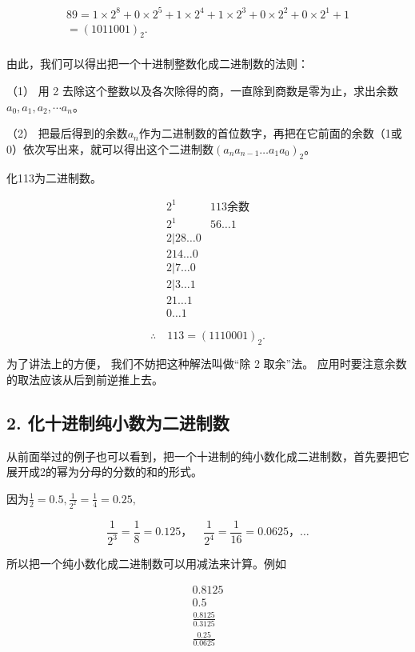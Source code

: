 \[
\begin{array}{l} 89 = 1 \times 2 ^{8} + 0 \times 2 ^{5} + 1 \times 2 ^{4} + 1 \times 2 ^{3} + 0 \times 2 ^{2} + 0 \times 2 ^{1} + 1 \\ = (1011001) _{2}. \\ \end{array}
\]

由此，我们可以得出把一个十进制整数化成二进制数的法则：

（1） 用 2
去除这个整数以及各次除得的商，一直除到商数是零为止，求出余数\(a_0, a_1, a_2, \cdots a_n\)。

（2）
把最后得到的余数\(a_{n}\)作为二进制数的首位数字，再把在它前面的余数（1或0）依次写出来，就可以得出这个二进制数\((a_{n}a_{n - 1}\dots a_{1}a_{0})_{2}\)。

 化113为二进制数。


\[
\begin{array}{rl} {2 ^{1}} & {113 \text{余数}} \\ {2 ^{1}} & {56 \dots 1} \\ {2 | 28 \dots 0} \\ {214 \dots 0} \\ {2 | 7 \dots 0} \\ {2 | 3 \dots 1} \\ {21 \dots 1} \\ \hline {0 \dots 1} \end{array}
\]

\[
\therefore \quad 113 = (1110001) _{2}.
\]

为了讲法上的方便， 我们不妨把这种解法叫做``除 2 取余''法。
应用时要注意余数的取法应该从后到前逆推上去。

\subsection{2. 化十进制纯小数为二进制数}

从前面举过的例子也可以看到，把一个十进制的纯小数化成二进制数，首先要把它展开成2的幂为分母的分数的和的形式。

因为\(\frac{1}{2} = 0.5, \frac{1}{2^2} = \frac{1}{4} = 0.25,\)

\[
\frac{1}{2 ^{3}} = \frac{1}{8} = 0.125\text{，} \quad \frac{1}{2 ^{4}} = \frac{1}{16} = 0.0625\text{，} \dots
\]

所以把一个纯小数化成二进制数可以用减法来计算。例如

\[
\begin{array}{l} 0.8125 \\ 0.5 \\ \frac{0.8125}{0.3125} \\ \frac{0.25}{0.0625} \\ \end{array}
\]

